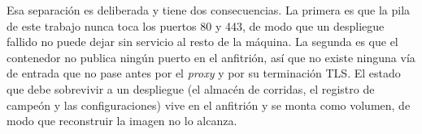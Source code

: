 Esa separación es deliberada y tiene dos consecuencias. La primera es que la pila de este trabajo nunca toca los puertos 80 y 443, de modo que un despliegue fallido no puede dejar sin servicio al resto de la máquina. La segunda es que el contenedor no publica ningún puerto en el anfitrión, así que no existe ninguna vía de entrada que no pase antes por el \textit{proxy} y por su terminación TLS. El estado que debe sobrevivir a un despliegue (el almacén de corridas, el registro de campeón y las configuraciones) vive en el anfitrión y se monta como volumen, de modo que reconstruir la imagen no lo alcanza.
